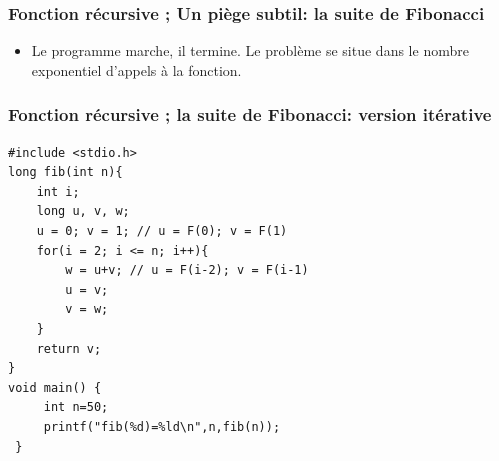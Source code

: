 \documentclass{beamer}
\begin{document}
\begin{frame}[fragile]
\frametitle{Fonction récursive ; Un piège subtil: la suite de Fibonacci}
 \begin{itemize}
\item Le programme marche, il termine. Le problème se situe dans le nombre exponentiel  d'appels à la fonction. 
 \end{itemize}
 
 
 \begin{center}

\end{center}

\end{frame}



\begin{frame}[fragile]
\frametitle{Fonction récursive ; la suite de Fibonacci: version itérative}

\begin{verbatim}  
#include <stdio.h> 
long fib(int n){ 
    int i;
    long u, v, w; 
    u = 0; v = 1; // u = F(0); v = F(1) 
    for(i = 2; i <= n; i++){ 
        w = u+v; // u = F(i-2); v = F(i-1) 
        u = v; 
        v = w; 
    } 
    return v;
}
void main() {
     int n=50;
     printf("fib(%d)=%ld\n",n,fib(n)); 
 }
\end{verbatim}

\end{frame}
\end{document}
